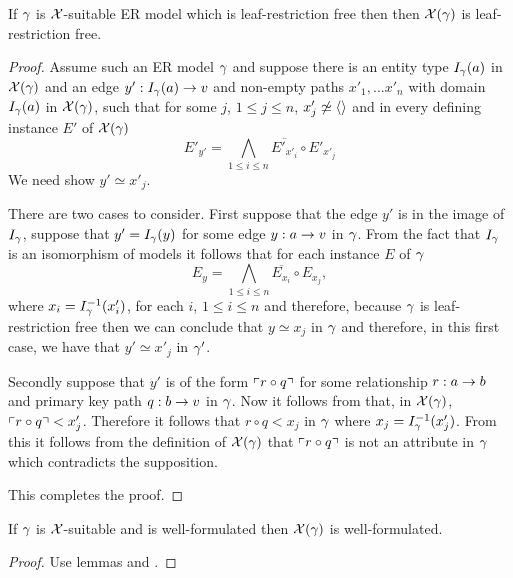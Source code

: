 \begin{lemma}
If $\gamma$ is $\mathcal{X}$-suitable ER model which is leaf-restriction free then
then $\mathcal{X}(\gamma)$ is leaf-restriction free.
\end{lemma}
\begin{proof}
Assume such an ER model $\gamma$ and suppose there is an entity type $I_\gamma(a)$ in $\mathcal{X}(\gamma)$ and an edge $y': I_\gamma(a) \rightarrow v$ and non-empty paths $x'_1,...x'_n$   with domain $I_\gamma(a)$ in $\mathcal{X}(\gamma)$,  such that for some $j$, $1 \leq j \leq n$, $x'_j \not\simeq \langle\rangle$ and in every defining instance $E'$ of $\mathcal{X}(\gamma)$  
\begin{equation}
\label{restrictioninchimodel}
E'_{y'} = \bigwedge_{1 \leq i \leq n}{\overline{E'_{x'_i}}} \circ E'_{x'_j}
\end{equation}
We need show  $y' \simeq x'_j$.

There are two cases to consider. First suppose that the edge $y'$ is in the image of $I_\gamma$, suppose that $y'=I_\gamma(y)$ for some edge
$y:a \rightarrow v$ in $\gamma$. From the fact that $I_\gamma$ is an isomorphism of models it follows that for each instance $E$ of  $\gamma$
$$E_{y} = \bigwedge_{1 \leq i \leq n}{\overline{E_{x_i}}} \circ E_{x_j},$$
where $x_i=I^{-1}_\gamma(x'_i)$, for each $i$, $1 \leq i \leq n$ and therefore, because $\gamma$ is leaf-restriction free then we can conclude that
$y \simeq x_j$ in $\gamma$ and therefore, in this first case, we have that $y' \simeq x'_j$ in $\gamma'$.


Secondly suppose that $y'$ is of the form $\left\ulcorner r \circ q\right\urcorner$ for some relationship $r: a \rightarrow b$ and primary key path $q :b \rightarrow v$ in $\gamma$.
Now it follows from  that, in $\mathcal{X}(\gamma)$, $\left\ulcorner r \circ q\right\urcorner < x'_j$. Therefore  
it follows that $r \circ q < x_j$ in $\gamma$  where $x_j= I^{-1}_\gamma(x'_j)$. From this it follows from the definition of $\mathcal{X}(\gamma)$ that
 $\left\ulcorner r \circ q\right\urcorner$ is not an attribute in $\gamma$ which contradicts the supposition. 

This completes the proof.
\end{proof}

\begin{lemma}
If  $\gamma$ is $\mathcal{X}$-suitable and is well-formulated then  $\mathcal{X}(\gamma)$ is well-formulated. 
\end{lemma}
\begin{proof}
Use lemmas  and .
\end{proof}

